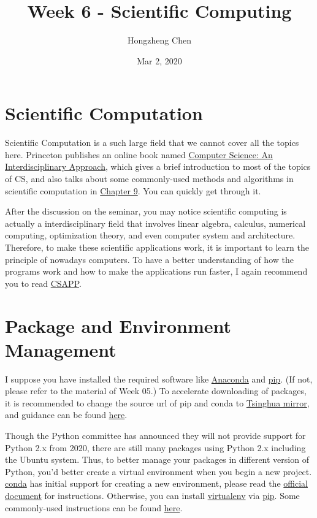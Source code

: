 \documentclass[english]{../TexTemplate/thesis}
\title{Week 6 - Scientific Computing}
\author{Hongzheng Chen}
\date{Mar 2, 2020}
\begin{document}
\maketitle

\section{Scientific Computation}
Scientific Computation is a such large field that we cannot cover all the topics here.
Princeton publishes an online book named \href{https://introcs.cs.princeton.edu/java/home/}{Computer Science: An Interdisciplinary Approach}, which gives a brief introduction to most of the topics of CS, and also talks about some commonly-used methods and algorithms in scientific computation in \href{https://introcs.cs.princeton.edu/java/90scientific/}{Chapter 9}. You can quickly get through it.

After the discussion on the seminar, you may notice scientific computing is actually a interdisciplinary field that involves linear algebra, calculus, numerical computing, optimization theory, and even computer system and architecture. Therefore, to make these scientific applications work, it is important to learn the principle of nowadays computers.
To have a better understanding of how the programs work and how to make the applications run faster, I again recommend you to read \href{https://csapp.cs.cmu.edu/}{CSAPP}.

\section{Package and Environment Management}
I suppose you have installed the required software like \href{https://www.anaconda.com/}{Anaconda} and \href{https://pypi.org/project/pip/}{pip}. (If not, please refer to the material of Week 05.) To accelerate downloading of packages, it is recommended to change the source url of pip and conda to \href{https://mirror.tuna.tsinghua.edu.cn/help/anaconda/}{Tsinghua mirror}, and guidance can be found \href{https://blog.csdn.net/weixin_41765699/article/details/83420149}{here}. 

Though the Python committee has announced they will not provide support for Python 2.x from 2020, there are still many packages using Python 2.x including the Ubuntu system. Thus, to better manage your packages in different version of Python, you'd better create a virtual environment when you begin a new project.
\href{https://conda.io/en/latest/}{conda} has initial support for creating a new environment, please read the \href{https://docs.conda.io/projects/conda/en/latest/user-guide/tasks/manage-environments.html}{official document} for instructions.
Otherwise, you can install \href{https://virtualenv.pypa.io/en/latest/}{virtualenv} via \href{https://pypi.org/project/pip/}{pip}. Some commonly-used instructions can be found \href{https://tecadmin.net/use-virtualenv-with-python3/}{here}.
\end{document}
